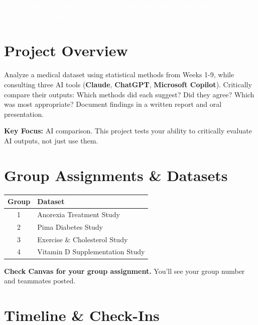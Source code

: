 \documentclass[9pt]{article}
\begin{document}
\begin{tcolorbox}[colback=osaorange,colframe=black,boxrule=2pt,arc=0pt,left=6pt,right=6pt,top=6pt,bottom=6pt]
\centering
\textcolor{white}{\textbf{\large H524 GROUP PROJECT: AI COMPARISON IN BIOSTATISTICS}}\\
\textcolor{white}{\textbf{Fall 2025 — Complete Project Guide}}
\end{tcolorbox}

\vspace{-4pt}

\section*{Project Overview}

Analyze a medical dataset using statistical methods from Weeks 1-9, while consulting three AI tools (\textbf{Claude}, \textbf{ChatGPT}, \textbf{Microsoft Copilot}). Critically compare their outputs: Which methods did each suggest? Did they agree? Which was most appropriate? Document findings in a written report and oral presentation.

\textbf{Key Focus:} AI comparison. This project tests your ability to critically evaluate AI outputs, not just use them.

\vspace{2pt}

\section*{Group Assignments \& Datasets}

\begin{center}
\small
\begin{tabular}{cl}
\toprule
\textbf{Group} & \textbf{Dataset} \\
\midrule
1 & Anorexia Treatment Study \\
2 & Pima Diabetes Study \\
3 & Exercise \& Cholesterol Study \\
4 & Vitamin D Supplementation Study \\
\bottomrule
\end{tabular}
\end{center}

\textbf{Check Canvas for your group assignment.} You'll see your group number and teammates posted.

\vspace{2pt}

\section*{Timeline \& Check-Ins}
\end{document}
